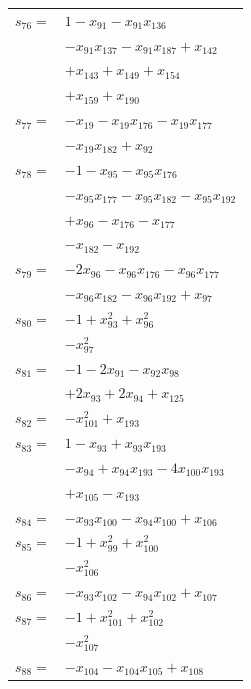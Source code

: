 \begin{longtable}{@{}r@{\;}l@{}}
\(s_{76}=\) & \(\displaystyle 1 -x_{91} -x_{91}x_{136}\) \\
 & \(\displaystyle -x_{91}x_{137} -x_{91}x_{187} +x_{142}\) \\
 & \(\displaystyle +x_{143} +x_{149} +x_{154}\) \\
 & \(\displaystyle +x_{159} +x_{190}\) \\[3pt]
\(s_{77}=\) & \(\displaystyle -x_{19} -x_{19}x_{176} -x_{19}x_{177}\) \\
 & \(\displaystyle -x_{19}x_{182} +x_{92}\) \\[3pt]
\(s_{78}=\) & \(\displaystyle -1 -x_{95} -x_{95}x_{176}\) \\
 & \(\displaystyle -x_{95}x_{177} -x_{95}x_{182} -x_{95}x_{192}\) \\
 & \(\displaystyle +x_{96} -x_{176} -x_{177}\) \\
 & \(\displaystyle -x_{182} -x_{192}\) \\[3pt]
\(s_{79}=\) & \(\displaystyle -2x_{96} -x_{96}x_{176} -x_{96}x_{177}\) \\
 & \(\displaystyle -x_{96}x_{182} -x_{96}x_{192} +x_{97}\) \\[3pt]
\(s_{80}=\) & \(\displaystyle -1 +x_{93}^{2} +x_{96}^{2}\) \\
 & \(\displaystyle -x_{97}^{2}\) \\[3pt]
\(s_{81}=\) & \(\displaystyle -1 -2x_{91} -x_{92}x_{98}\) \\
 & \(\displaystyle +2x_{93} +2x_{94} +x_{125}\) \\[3pt]
\(s_{82}=\) & \(\displaystyle -x_{101}^{2} +x_{193}\) \\[3pt]
\(s_{83}=\) & \(\displaystyle 1 -x_{93} +x_{93}x_{193}\) \\
 & \(\displaystyle -x_{94} +x_{94}x_{193} -4x_{100}x_{193}\) \\
 & \(\displaystyle +x_{105} -x_{193}\) \\[3pt]
\(s_{84}=\) & \(\displaystyle -x_{93}x_{100} -x_{94}x_{100} +x_{106}\) \\[3pt]
\(s_{85}=\) & \(\displaystyle -1 +x_{99}^{2} +x_{100}^{2}\) \\
 & \(\displaystyle -x_{106}^{2}\) \\[3pt]
\(s_{86}=\) & \(\displaystyle -x_{93}x_{102} -x_{94}x_{102} +x_{107}\) \\[3pt]
\(s_{87}=\) & \(\displaystyle -1 +x_{101}^{2} +x_{102}^{2}\) \\
 & \(\displaystyle -x_{107}^{2}\) \\[3pt]
\(s_{88}=\) & \(\displaystyle -x_{104} -x_{104}x_{105} +x_{108}\) \\[3pt]

\end{longtable}
